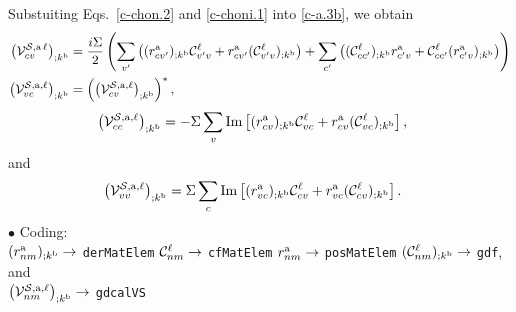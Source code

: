 Substuiting Eqs.~\eqref{c-chon.2} and \eqref{c-choni.1} into \eqref{c-a.3b}, we obtain
\begin{align}\label{dgvs.cv}
\left({\mathbf{\cal V}}^{{\cal S},\mathrm{a}\,\ell}_{cv}\right)_{;k^{\mathrm{b}}}
&=
\frac{i\Sigma}{2}
\left(
\sum_{v'}\left(
 (r^{\mathrm{a}}_{cv'})_{;k^{\mathrm{b}}}{\mathbf{\cal C}}^\ell_{v'v}
+  
r^{\mathrm{a}}_{cv'}({\mathbf{\cal C}}^\ell_{v'v})_{;k^{\mathrm{b}}}
\right)
+
\sum_{c'}\left(
({\mathbf{\cal C}}^\ell_{cc'})_{;k^{\mathrm{b}}} r^{\mathrm{a}}_{c'v}
+
{\mathbf{\cal C}}^\ell_{cc'} (r^{\mathrm{a}}_{c'v})_{;k^{\mathrm{b}}}
\right)
\right)
\nonumber\\
\left({\mathbf{\cal V}}^{{\cal S},\mathrm{a},\ell}_{vc}\right)_{;k^{\mathrm{b}}}
&=
\left(\left({\mathbf{\cal V}}^{{\cal S},\mathrm{a},\ell}_{cv}\right)_{;k^{\mathrm{b}}}\right)^*
,
\end{align}  
\begin{align}\label{dgvs.cc}
\left({\mathbf{\cal V}}^{{\cal S},\mathrm{a},\ell}_{cc}\right)_{;k^{\mathrm{b}}}
&=
-\Sigma
\sum_{v}
 \mathrm{Im}\left[(r^{\mathrm{a}}_{cv})_{;k^{\mathrm{b}}}{\mathbf{\cal C}}^\ell_{vc}
+
r^{\mathrm{a}}_{cv}
({\mathbf{\cal C}}^\ell_{vc}) _{;k^{\mathrm{b}}}\right]
,
\end{align}  
and
\begin{align}\label{dgvs.vv}
\left({\mathbf{\cal V}}^{{\cal S},\mathrm{a},\ell}_{vv}\right)_{;k^{\mathrm{b}}}
&=
\Sigma
\sum_{c}
 \mathrm{Im}\left[(r^{\mathrm{a}}_{vc})_{;k^{\mathrm{b}}}{\mathbf{\cal C}}^\ell_{cv}
+
r^{\mathrm{a}}_{vc}({\mathbf{\cal C}}^\ell_{cv}) _{;k^{\mathrm{b}}}\right]
.
\end{align}  
$\bullet$ Coding:\\
$(r^{\mathrm{a}}_{nm})_{;k^{\mathrm{b}}}\to$ \verb=derMatElem=
${\mathbf{\cal C}}^\ell_{nm}\to$ \verb=cfMatElem=
$r^{\mathrm{a}}_{nm}\to$ \verb=posMatElem=
$({\mathbf{\cal C}}^\ell_{nm})_{;k^{\mathrm{b}}}\to$ \verb=gdf=, and\\
$\left({\mathbf{\cal V}}^{{\cal S},\mathrm{a},\ell}_{nm}\right)_{;k^{\mathrm{b}}}\to$ 
\verb=gdcalVS=

